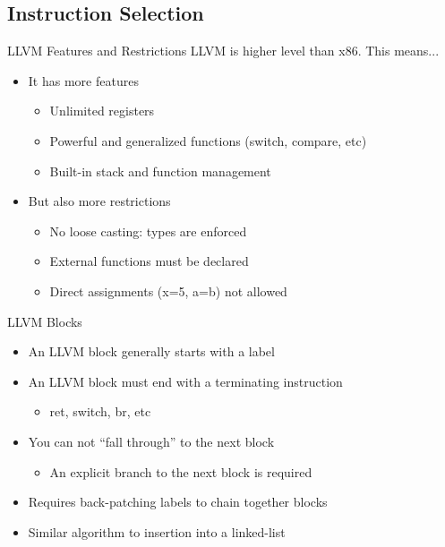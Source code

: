 \documentclass{beamer}
\begin{document}
\subsection{Instruction Selection}

\begin{frame}{LLVM Features and Restrictions}
  LLVM is higher level than x86. This means...
  \pause
  \begin{itemize}
  \item<1->It has more features
    \begin{itemize}
    \item<2->Unlimited registers
    \item<3->Powerful and generalized functions (switch, compare, etc)
    \item<4->Built-in stack and function management
    \end{itemize}
  \item<5->But also more restrictions
    \begin{itemize}
      \item<6-> No loose casting: types are enforced
      \item<7-> External functions must be declared
      \item<8-> Direct assignments (x=5, a=b) not allowed
    \end{itemize}
  \end{itemize}
\end{frame}


\begin{frame}{LLVM Blocks}
  \begin{itemize}
  \item<2-> An LLVM block generally starts with a label
  \item<3-> An LLVM block must end with a terminating instruction
    \begin{itemize}
    \item ret, switch, br, etc
    \end{itemize}
  \item<4-> You can not ``fall through'' to the next block
    \begin{itemize}
    \item An explicit branch to the next block is required
    \end{itemize}
  \end{itemize}
  \begin{itemize}
  \item<6-> Requires back-patching labels to chain together blocks
  \item<7-> Similar algorithm to insertion into a linked-list
  \end{itemize}
\end{frame}
\end{document}
